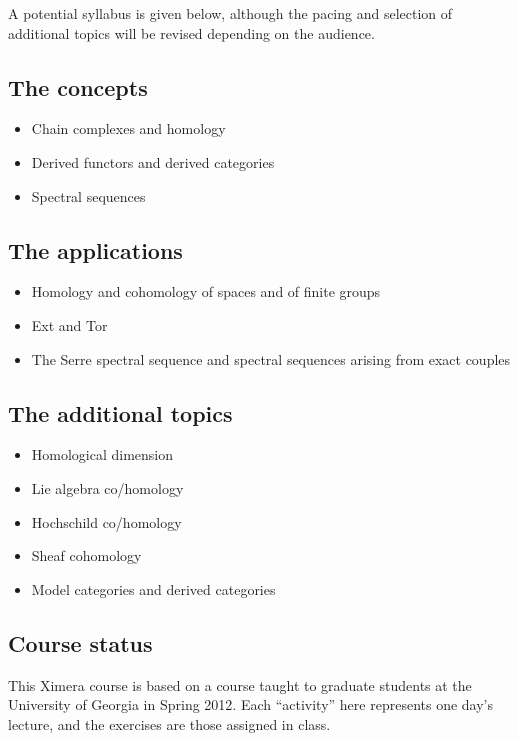 \documentclass{ximera}
\begin{document}
A potential syllabus is given below, although the pacing and selection
of additional topics will be revised depending on the audience.

\subsection{The concepts}

\begin{itemize}
\item Chain complexes and homology
\item Derived functors and derived categories
\item Spectral sequences
\end{itemize}

\subsection{The applications}

\begin{itemize}
\item Homology and cohomology of spaces and of finite groups
\item Ext and Tor
\item The Serre spectral sequence and spectral sequences arising from exact couples
\end{itemize}

\subsection{The additional topics}

\begin{itemize}
\item Homological dimension
\item Lie algebra co/homology
\item Hochschild co/homology
\item Sheaf cohomology
\item Model categories and derived categories
\end{itemize}



\subsection{Course status}

This Ximera course is based on a course taught to graduate students at
the University of Georgia in Spring 2012.  Each ``activity'' here
represents one day's lecture, and the exercises are those assigned in
class.
\end{document}
